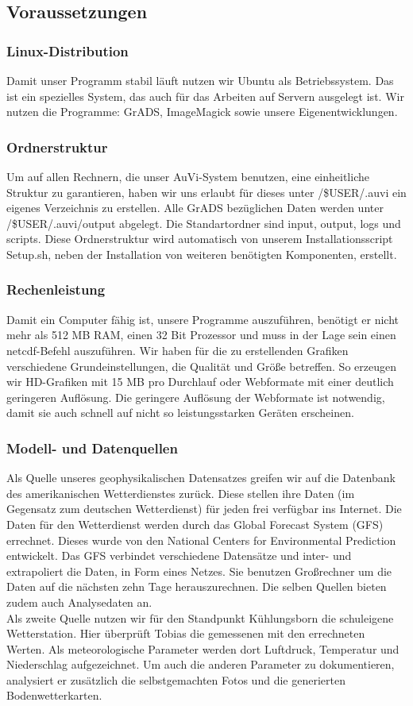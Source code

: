 \documentclass[a4paper,oneside,12pt,titlepage]{article}
\begin{document}
    \subsection{Voraussetzungen}
        \subsubsection{Linux-Distribution}
            Damit unser Programm stabil läuft nutzen wir Ubuntu als Betriebssystem. Das ist ein spezielles System, das auch für das Arbeiten auf Servern ausgelegt ist. Wir nutzen die Programme: GrADS, ImageMagick sowie unsere Eigenentwicklungen.
\newpage
        \subsubsection{Ordnerstruktur}
            Um auf allen Rechnern, die unser AuVi-System benutzen, eine einheitliche Struktur zu garantieren, haben wir uns erlaubt für dieses unter /\$USER/.auvi ein eigenes Verzeichnis zu erstellen. Alle GrADS bezüglichen Daten werden unter /\$USER/.auvi/output abgelegt. Die Standartordner sind input, output, logs und scripts. Diese Ordnerstruktur wird automatisch von unserem Installationsscript Setup.sh, neben der Installation von weiteren benötigten Komponenten, erstellt.
        \subsubsection{Rechenleistung}
            Damit ein Computer fähig ist, unsere Programme auszuführen, benötigt er nicht mehr als 512 MB RAM, einen 32 Bit Prozessor und muss in der Lage sein einen netcdf-Befehl auszuführen. Wir haben für die zu erstellenden Grafiken verschiedene Grundeinstellungen, die Qualität und Größe betreffen. So erzeugen wir HD-Grafiken mit 15 MB pro Durchlauf oder Webformate mit einer deutlich geringeren Auflösung. Die geringere Auflösung der Webformate ist notwendig, damit sie auch schnell auf nicht so leistungsstarken Geräten erscheinen.
        \subsubsection{Modell- und Datenquellen}
            Als Quelle unseres geophysikalischen Datensatzes greifen wir auf die Datenbank des amerikanischen Wetterdienstes zurück. Diese stellen ihre Daten (im Gegensatz zum deutschen Wetterdienst) für jeden frei verfügbar ins Internet. Die Daten für den Wetterdienst werden durch das Global Forecast System (GFS) errechnet. Dieses wurde von den  National Centers for Environmental Prediction entwickelt. Das GFS verbindet verschiedene Datensätze und inter- und extrapoliert die Daten, in Form eines Netzes. Sie benutzen Großrechner um die Daten auf die nächsten zehn Tage herauszurechnen. Die selben Quellen bieten zudem auch Analysedaten an.\\Als zweite Quelle nutzen wir für den Standpunkt Kühlungsborn die schuleigene Wetterstation. Hier überprüft Tobias die gemessenen mit den errechneten Werten. Als meteorologische Parameter werden dort Luftdruck, Temperatur und Niederschlag aufgezeichnet. Um auch die anderen Parameter zu dokumentieren, analysiert er zusätzlich die selbstgemachten Fotos und die generierten Bodenwetterkarten.
\end{document}

